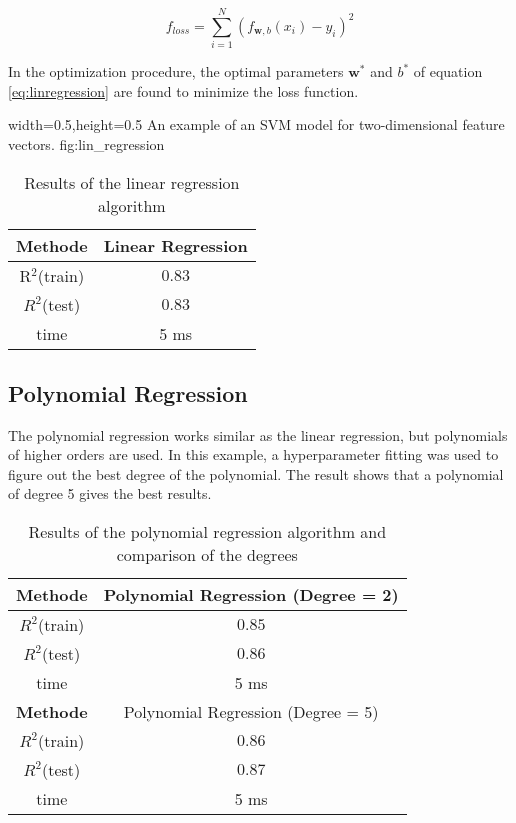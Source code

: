 \begin{equation}
   f_{loss} = \sum_{i = 1}^{N} (f_{\textbf{w},b}(x_{i}) - y_i)^{2} 
\end{equation}

In the optimization procedure, the optimal parameters $\textbf{w}^{*}$ and $b^{*}$ of equation \ref{eq:linregression} are found to minimize the loss function. 

  {width=0.5\textwidth,height=0.5\textheight}%
  {An example of an SVM model for two-dimensional feature vectors.}%
  {}%
  {fig:lin_regression}%
  
 
  
\begin{table}%
\centering
\caption{Results of the linear regression algorithm \label{tab:lin_regression}}
\vspace{1mm}
\begin{tabular}
{| c | c | } 
\hline
\textbf{Methode} & Linear Regression \\ \hline
R$^{2}$(train) & $0.83$ \\ \hline
$R^{2}$(test) & $0.83$ \\ \hline 
time & 5 ms \\ \hline

\end{tabular}
\end{table}
  
  
\subsection{Polynomial Regression}

The polynomial regression works similar as the linear regression, but polynomials of higher orders are used. In this example, a hyperparameter fitting was used to figure out the best degree of the polynomial. The result shows that a polynomial of degree 5 gives the best results. \\

\begin{table}%
\centering
\caption{Results of the polynomial regression algorithm and comparison of the degrees \label{tab:pol_regression}}
\vspace{1mm}
\begin{tabular}
{| c | c | } 
\hline
\textbf{Methode} & Polynomial Regression (Degree = 2) \\ \hline
$R^{2}$(train) & $0.85$ \\ \hline
$R^{2}$(test) & $0.86$ \\ \hline 
time & 5 ms \\ \hline
\textbf{Methode} & Polynomial Regression (Degree = 5) \\ \hline
$R^{2}$(train) & $0.86$ \\ \hline
$R^{2}$(test) & $0.87$ \\ \hline 
time & 5 ms \\ \hline

\end{tabular}
\end{table}
  
